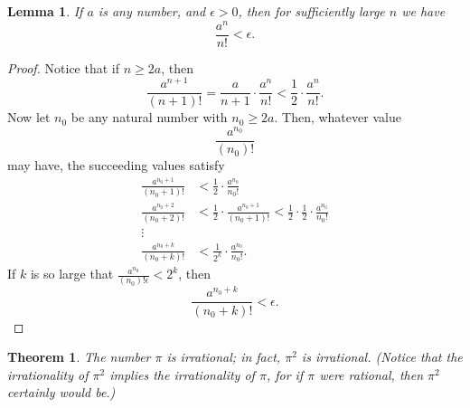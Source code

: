 \documentclass{article}
\newtheorem*{lemma*}{Lemma}
\newtheorem{theorem}{Theorem}
\begin{document}
\begin{lemma*}
  If $a$ is any number, and $\epsilon > 0$, then for sufficiently large $n$ we
  have \begin{equation*}
    \frac{a^n}{n!} < \epsilon.
  \end{equation*}
\end{lemma*}

\begin{proof}
  Notice that if $n \geq 2a$, then \begin{equation*}
    \frac{a^{n + 1}}{(n + 1)!} = \frac{a}{n + 1} \cdot \frac{a^n}{n!} <
    \frac{1}{2} \cdot \frac{a^n}{n!}.
  \end{equation*} Now let $n_0$ be any natural number with $n_0 \geq 2a$. Then,
  whatever value \begin{equation*}
    \frac{a^{n_0}}{(n_0)!}
    \end{equation*} may have, the succeeding values satisfy \begin{align*}
    \frac{a^{n_0 + 1}}{(n_0 + 1)!} &< \frac{1}{2} \cdot \frac{a^{n_0}}{n_0!} \\
    \frac{a^{n_0 + 2}}{(n_0 + 2)!} &< \frac{1}{2} \cdot
                                   \frac{a^{n_0 + 1}}{(n_0 + 1)!}
                                   < \frac{1}{2} \cdot \frac{1}{2} \cdot
                                   \frac{a^{n_0}}{n_0!} \\
    \vdots& \\
    \frac{a^{n_0 + k}}{(n_0 + k)!} &< \frac{1}{2^k} \cdot \frac{a^{n_0}}{n_0!}.
  \end{align*} If $k$ is so large that $\frac{a^{n_0}}{(n_0)!\epsilon} < 2^k$,
  then \begin{equation*}
    \frac{a^{n_0 + k}}{(n_0 + k)!} < \epsilon.
  \end{equation*}
\end{proof}

\begin{theorem}
  The number $\pi$ is irrational; in fact, $\pi^2$ is irrational. (Notice that
  the irrationality of $\pi^2$ implies the irrationality of $\pi$, for if $\pi$
  were rational, then $\pi^2$ certainly would be.)
\end{theorem}
\end{document}
